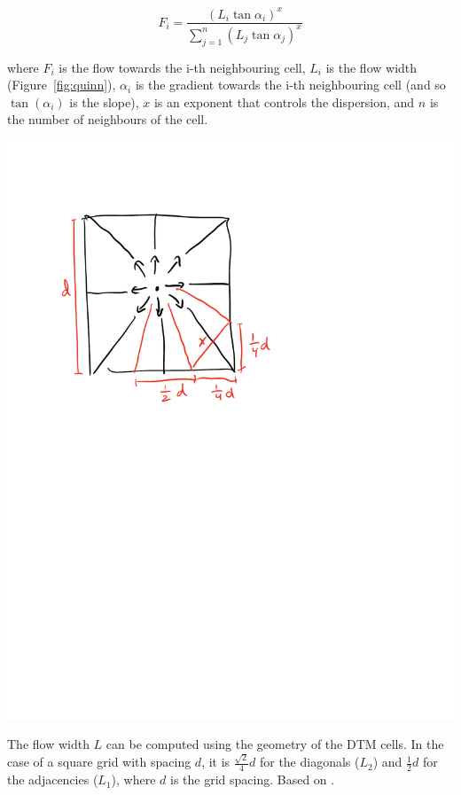 \begin{equation}
F_i = \frac{\left(L_i \tan{\alpha_i}\right)^x}{\sum_{j=1}^{n}\left(L_j \tan{\alpha_j}\right)^x}
\end{equation}

where \(F_i\) is the flow towards the i-th neighbouring cell, \(L_i\) is the flow width (Figure~\ref{fig:quinn}), \(\alpha_i\) is the gradient towards the i-th neighbouring cell (and so \(\tan(\alpha_i)\) is the slope), \(x\) is an exponent that controls the dispersion, and \(n\) is the number of neighbours of the cell.

\begin{marginfigure}
\centering
\includegraphics[width=\linewidth]{figs/quinn.pdf}
\caption{The flow width \(L\) can be computed using the geometry of the DTM cells.
In the case of a square grid with spacing \(d\), it is \(\frac{\sqrt{2}}{4}d\) for the diagonals (\(L_2\)) and \(\frac{1}{2}d\) for the adjacencies (\(L_1\)), where \(d\) is the grid spacing. Based on \citet{Quinn91}.}%
\label{fig:quinn}
\end{marginfigure}


